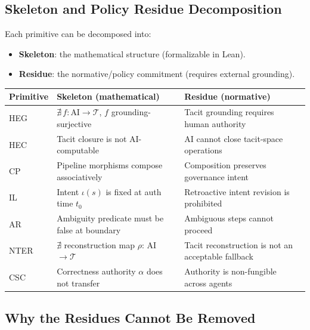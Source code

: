 \subsection{Skeleton and Policy Residue Decomposition}

Each primitive can be decomposed into:
\begin{itemize}
  \item \textbf{Skeleton}: the mathematical structure (formalizable in Lean).
  \item \textbf{Residue}: the normative/policy commitment (requires external grounding).
\end{itemize}

\begin{center}
\begin{tabular}{lll}
\toprule
Primitive & Skeleton (mathematical) & Residue (normative) \\
\midrule
HEG & $\nexists\, f : \text{AI} \to \mathcal{T}$, $f$ grounding-surjective & Tacit grounding requires human authority \\
HEC & Tacit closure is not AI-computable & AI cannot close tacit-space operations \\
CP & Pipeline morphisms compose associatively & Composition preserves governance intent \\
IL & Intent $\iota(s)$ is fixed at auth time $t_0$ & Retroactive intent revision is prohibited \\
AR & Ambiguity predicate must be false at boundary & Ambiguous steps cannot proceed \\
NTER & $\nexists$ reconstruction map $\rho$: AI $\to \mathcal{T}$ & Tacit reconstruction is not an acceptable fallback \\
CSC & Correctness authority $\alpha$ does not transfer & Authority is non-fungible across agents \\
\bottomrule
\end{tabular}
\end{center}

\subsection{Why the Residues Cannot Be Removed}

